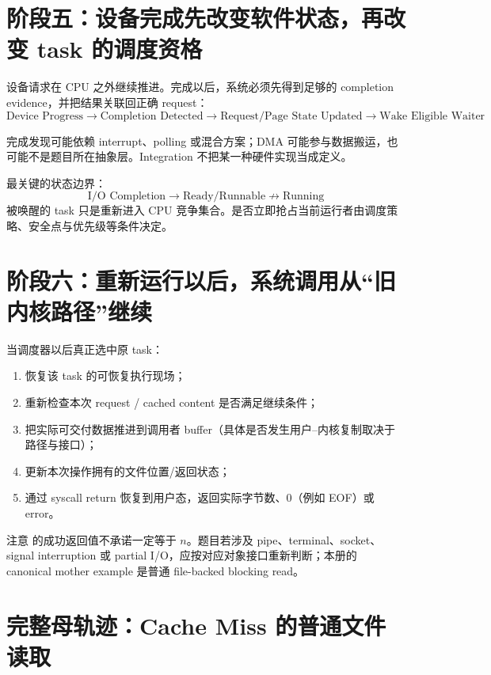 \documentclass[UTF8,fontset=none,11pt,a4paper]{ctexart}
\begin{document}
\section{阶段五：设备完成先改变软件状态，再改变 task 的调度资格}

设备请求在 CPU 之外继续推进。完成以后，系统必须先得到足够的 completion evidence，并把结果关联回正确 request：
\[
\text{Device Progress}
\to \text{Completion Detected}
\to \text{Request/Page State Updated}
\to \text{Wake Eligible Waiter}
\]

完成发现可能依赖 interrupt、polling 或混合方案；DMA 可能参与数据搬运，也可能不是题目所在抽象层。Integration 不把某一种硬件实现当成定义。

最关键的状态边界：
\[
\boxed{\text{I/O Completion} \to \text{Ready/Runnable} \not\to \text{Running}}
\]
被唤醒的 task 只是重新进入 CPU 竞争集合。是否立即抢占当前运行者由调度策略、安全点与优先级等条件决定。

\section{阶段六：重新运行以后，系统调用从“旧内核路径”继续}

当调度器以后真正选中原 task：
\begin{enumerate}
  \item 恢复该 task 的可恢复执行现场；
  \item 重新检查本次 request / cached content 是否满足继续条件；
  \item 把实际可交付数据推进到调用者 buffer（具体是否发生用户--内核复制取决于路径与接口）；
  \item 更新本次操作拥有的文件位置/返回状态；
  \item 通过 syscall return 恢复到用户态，返回实际字节数、0（例如 EOF）或 error。
\end{enumerate}

注意  的成功返回值不承诺一定等于 $n$。题目若涉及 pipe、terminal、socket、signal interruption 或 partial I/O，应按对应对象接口重新判断；本册的 canonical mother example 是普通 file-backed blocking read。

\section{完整母轨迹：Cache Miss 的普通文件读取}
\end{document}
